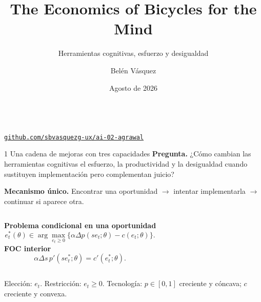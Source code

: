 \documentclass[aspectratio=169,11pt]{beamer}
\title[Agrawal et al. (2025)]{The Economics of Bicycles for the Mind}
\subtitle{Herramientas cognitivas, esfuerzo y desigualdad}
\author{Belén Vásquez}
\institute{Universidad del Pacífico}
\date{Agosto de 2026}
\begin{document}
\begin{frame}[plain]
  \titlepage
  \vspace{-0.8em}
  \begin{center}
    \small \paperref\\[0.45em]
    \href{\RepoURL}{\texttt{github.com/sbvasquezg-ux/ai-02-agrawal}}
  \end{center}
\end{frame}

\begin{frame}{1 \textperiodcentered{} Una cadena de mejoras con tres capacidades}
  \textbf{Pregunta.} ¿Cómo cambian las herramientas cognitivas el esfuerzo,
  la productividad y la desigualdad cuando sustituyen implementación pero
  complementan juicio?

  \medskip
  \textbf{Mecanismo único.} Encontrar una oportunidad $\to$ intentar
  implementarla $\to$ continuar si aparece otra.

  \medskip
  \begin{columns}[T,onlytextwidth]
    \textbf{Problema condicional en una oportunidad}
    \[
      e_t^*(\theta)\in\arg\max_{e_t\ge0}
      \{\alpha\Delta p(se_t;\theta)-c(e_t;\theta)\}.
    \]
    \textbf{FOC interior}
    \[
      \alpha\Delta s\,p'(se_t^*;\theta)=c'(e_t^*;\theta).
    \]
  \end{columns}

  \smallskip
  \footnotesize Elección: $e_t$. Restricción: $e_t\ge0$. Tecnología:
  $p\in[0,1]$ creciente y cóncava; $c$ creciente y convexa.
\end{frame}
\end{document}
